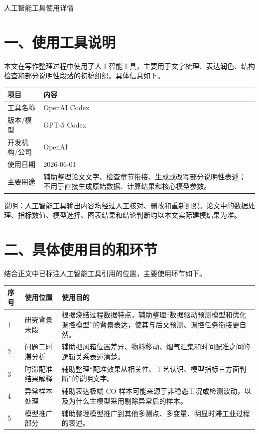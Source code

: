 \documentclass[UTF8,a4paper,zihao=-4]{ctexart}
\begin{document}
\begin{center}
{\heiti 人工智能工具使用详情}
\end{center}

\section*{一、使用工具说明}

本文在写作整理过程中使用了人工智能工具，主要用于文字梳理、表达润色、结构检查和部分说明性段落的初稿组织。具体信息如下。

\begin{longtable}{p{3.1cm}p{10.2cm}}
\toprule
项目 & 内容 \\
\midrule
工具名称 & OpenAI Codex \\
版本/模型 & GPT-5 Codex \\
开发机构/公司 & OpenAI \\
使用日期 & 2026-06-01 \\
主要用途 & 辅助整理论文文字、检查章节衔接、生成或改写部分说明性表述；不用于直接生成原始数据、计算结果和核心模型参数。 \\
\bottomrule
\end{longtable}

说明：人工智能工具输出内容均经过人工核对、删改和重新组织。论文中的数据处理、指标数值、模型选择、图表结果和结论判断均以本文实际建模结果为准。

\section*{二、具体使用目的和环节}

结合正文中已标注人工智能工具引用的位置，主要使用环节如下。

\begin{longtable}{p{1.0cm}p{3.2cm}p{8.7cm}}
\toprule
序号 & 使用位置 & 使用目的 \\
\midrule
1 & 研究背景末段 & 根据烧结过程数据特点，辅助整理“数据驱动预测模型和优化调控模型”的背景表达，使其与后文预测、调控任务衔接更自然。 \\
2 & 问题二时滞分析 & 辅助把风箱位置差异、物料移动、烟气汇集和时间配准之间的逻辑关系表述清楚。 \\
3 & 时滞配准结果解释 & 辅助整理“配准效果从相关性、工艺认识、模型指标三方面判断”的说明文字。 \\
4 & 异常样本处理 & 辅助表达极端 CO 样本可能来源于非稳态工况或检测波动，以及为什么主模型采用剔除异常后的样本。 \\
5 & 模型推广部分 & 辅助整理模型推广到其他多测点、多变量、明显时滞工业过程的表述。 \\
\bottomrule
\end{longtable}
\end{document}
